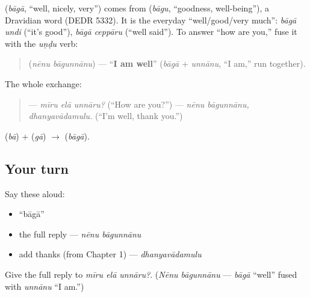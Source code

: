\begin{cousinweb}
\textbf{} (\emph{bāgā}, \textquotedblleft{}well, nicely, very\textquotedblright{}) comes from \textbf{} (\emph{bāgu}, \textquotedblleft{}goodness, well-being\textquotedblright{}), a Dravidian word (DEDR 5332). It is the everyday \textquotedblleft{}well/good/very much\textquotedblright{}: \emph{bāgā undi} (\textquotedblleft{}it's good\textquotedblright{}), \emph{bāgā ceppāru} (\textquotedblleft{}well said\textquotedblright{}). To answer \textquotedblleft{}how are you,\textquotedblright{} fuse it with the \emph{uṇḍu} verb:

\begin{quote}
\textbf{ } (\emph{nēnu bāgunnānu}) — \textquotedblleft{}\textbf{I am well}\textquotedblright{} (\emph{bāgā} + \emph{unnānu}, \textquotedblleft{}I am,\textquotedblright{} run together).
\end{quote}

The whole exchange:

\begin{quote}
— \emph{mīru elā unnāru?} (\textquotedblleft{}How are you?\textquotedblright{}) — \emph{nēnu bāgunnānu, dhanyavādamulu.} (\textquotedblleft{}I'm well, thank you.\textquotedblright{})
\end{quote}
\end{cousinweb}

\begin{sounds}
 (\emph{bā}) +  (\emph{gā}) $\to$  (\emph{bāgā}).
\end{sounds}

\subsection*{Your turn}
Say these aloud:

\begin{itemize}
\raggedright
  \item \textquotedblleft{}bāgā\textquotedblright{}
  \item the full reply — \emph{nēnu bāgunnānu}
  \item add thanks (from Chapter 1) — \emph{dhanyavādamulu}
\end{itemize}

\begin{tcolorbox}[breakable,colback=teal!4,colframe=teal!35!black,title={Before you move on}]
Give the full reply to \emph{mīru elā unnāru?}. (\emph{Nēnu bāgunnānu} — \emph{bāgā} \textquotedblleft{}well\textquotedblright{} fused with \emph{unnānu} \textquotedblleft{}I am.\textquotedblright{})
\end{tcolorbox}
